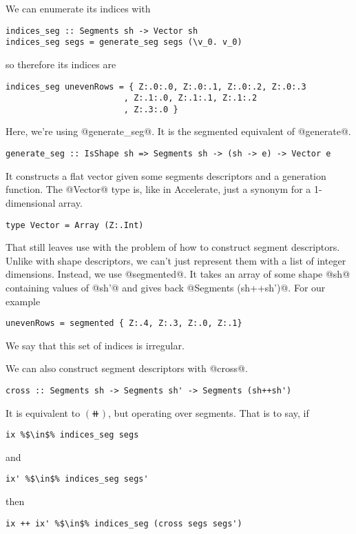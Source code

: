 We can enumerate its indices with
%
\begin{lstlisting}[style=ndp]
indices_seg :: Segments sh -> Vector sh
indices_seg segs = generate_seg segs (\v_0. v_0)
\end{lstlisting}
%
so therefore its indices are
%
\begin{lstlisting}[style=ndp]
indices_seg unevenRows = { Z:.0:.0, Z:.0:.1, Z:.0:.2, Z:.0:.3
                        , Z:.1:.0, Z:.1:.1, Z:.1:.2
                        , Z:.3:.0 }
\end{lstlisting}
%
Here, we're using @generate_seg@. It is the segmented equivalent of @generate@.
%
\begin{lstlisting}[style=ndp]
generate_seg :: IsShape sh => Segments sh -> (sh -> e) -> Vector e
\end{lstlisting}
%
It constructs a flat vector given some segments descriptors and a generation function. The @Vector@ type is, like in Accelerate, just a synonym for a 1-dimensional array.
%
\begin{lstlisting}[style=ndp]
type Vector = Array (Z:.Int)
\end{lstlisting}

That still leaves use with the problem of how to construct segment descriptors. Unlike with shape descriptors, we can't just represent them with a list of integer dimensions. Instead, we use @segmented@. It takes an array of some shape @sh@ containing values of @sh'@ and gives back @Segments (sh++sh')@. For our example
%
\begin{lstlisting}[style=ndp]
unevenRows = segmented { Z:.4, Z:.3, Z:.0, Z:.1}
\end{lstlisting}
%
We say that this set of indices is irregular.

We can also construct segment descriptors with @cross@.
%
\begin{lstlisting}[style=ndp]
cross :: Segments sh -> Segments sh' -> Segments (sh++sh')
\end{lstlisting}
%
It is equivalent to $(\doubleplus)$, but operating over segments. That is to say, if
%
\begin{lstlisting}[style=ndp]
ix %$\in$% indices_seg segs
\end{lstlisting}
%
and
%
\begin{lstlisting}[style=ndp]
ix' %$\in$% indices_seg segs'
\end{lstlisting}
%
then
%
\begin{lstlisting}[style=ndp]
ix ++ ix' %$\in$% indices_seg (cross segs segs')
\end{lstlisting}

